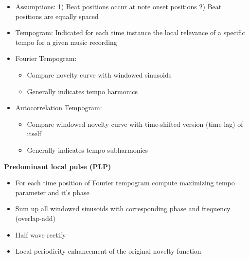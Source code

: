 \documentclass{scrartcl}
\begin{document}
\begin{itemize}
    \item
        Assumptions: 1) Beat positions occur at note onset positions 2) Beat positions are equally spaced
    \item
        Tempogram: Indicated for each time instance the local relevance of a specific tempo for a given music recording
    \item Fourier Tempogram:
        \begin{itemize}
            \item
                Compare novelty curve with windowed sinusoids
            \item
                Generally indicates tempo harmonics
        \end{itemize}
    \item
        Autocorrelation Tempogram:
        \begin{itemize}
            \item
                Compare windowed novelty curve with time-shifted version (time lag) of itself
            \item
                Generally indicates tempo subharmonics
        \end{itemize}
\end{itemize}
\textbf{Predominant local pulse (PLP)}
\begin{itemize}
    \item
        For each time position of Fourier tempogram compute maximizing tempo parameter and it's phase
    \item
        Sum up all windowed sinusoids with corresponding phase and frequency (overlap-add)
    \item
        Half wave rectify
    \item
        Local periodicity enhancement of the original novelty function
\end{itemize}
\end{document}
